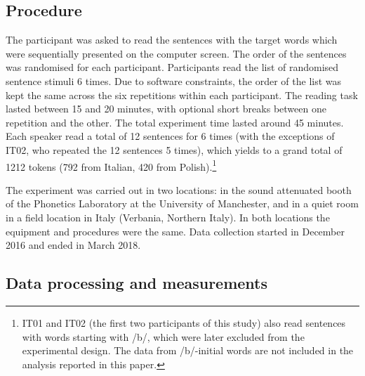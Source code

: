 \documentclass[12pt,]{article}
\let\rmarkdownfootnote\footnote%
\def\footnote{\protect\rmarkdownfootnote}
\begin{document}
\hypertarget{procedure}{%
\subsection{Procedure}\label{procedure}}

The participant was asked to read the sentences with the target words
which were sequentially presented on the computer screen. The order of
the sentences was randomised for each participant. Participants read the
list of randomised sentence stimuli 6 times. Due to software
constraints, the order of the list was kept the same across the six
repetitions within each participant. The reading task lasted between 15
and 20 minutes, with optional short breaks between one repetition and
the other. The total experiment time lasted around 45 minutes. Each
speaker read a total of 12 sentences for 6 times (with the exceptions of
IT02, who repeated the 12 sentences 5 times), which yields to a grand
total of 1212 tokens (792 from Italian, 420 from
Polish).\footnote{IT01 and IT02 (the first two participants of this study) also read sentences with words starting with /b/, which were later excluded from the experimental design. The data from /b/-initial words are not included in the analysis reported in this paper.}

The experiment was carried out in two locations: in the sound attenuated
booth of the Phonetics Laboratory at the University of Manchester, and
in a quiet room in a field location in Italy (Verbania, Northern Italy).
In both locations the equipment and procedures were the same. Data
collection started in December 2016 and ended in March 2018.

\hypertarget{data-processing-and-measurements}{%
\subsection{Data processing and
measurements}\label{data-processing-and-measurements}}

\end{document}
